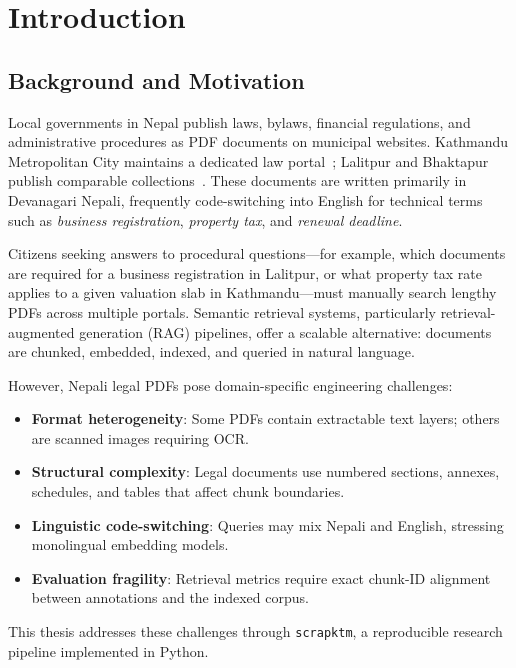 \chapter{Introduction}
\label{ch:introduction}

\section{Background and Motivation}
\label{sec:background}

Local governments in Nepal publish laws, bylaws, financial regulations, and administrative procedures as PDF documents on municipal websites. Kathmandu Metropolitan City maintains a dedicated law portal~\cite{kathmandu_law_portal}; Lalitpur and Bhaktapur publish comparable collections~\cite{lalitpur_portal,bhaktapur_portal}. These documents are written primarily in Devanagari Nepali, frequently code-switching into English for technical terms such as \emph{business registration}, \emph{property tax}, and \emph{renewal deadline}.

Citizens seeking answers to procedural questions---for example, which documents are required for a business registration in Lalitpur, or what property tax rate applies to a given valuation slab in Kathmandu---must manually search lengthy PDFs across multiple portals. Semantic retrieval systems, particularly retrieval-augmented generation (RAG) pipelines, offer a scalable alternative: documents are chunked, embedded, indexed, and queried in natural language.

However, Nepali legal PDFs pose domain-specific engineering challenges:
\begin{itemize}[leftmargin=*]
  \item \textbf{Format heterogeneity}: Some PDFs contain extractable text layers; others are scanned images requiring OCR.
  \item \textbf{Structural complexity}: Legal documents use numbered sections, annexes, schedules, and tables that affect chunk boundaries.
  \item \textbf{Linguistic code-switching}: Queries may mix Nepali and English, stressing monolingual embedding models.
  \item \textbf{Evaluation fragility}: Retrieval metrics require exact chunk-ID alignment between annotations and the indexed corpus.
\end{itemize}

This thesis addresses these challenges through \texttt{scrapktm}, a reproducible research pipeline implemented in Python.

